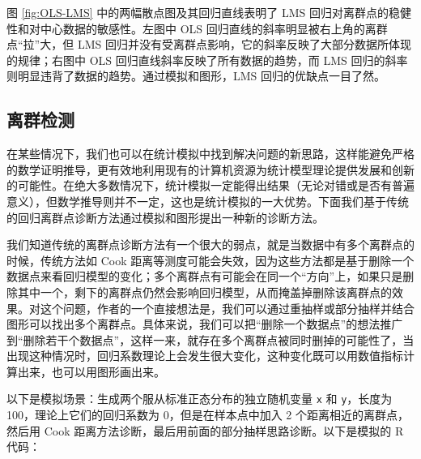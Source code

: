 \documentclass[
  b5paper,
  UTF8,twoside]{book}
\begin{document}
图 \ref{fig:OLS-LMS} 中的两幅散点图及其回归直线表明了 LMS 回归对离群点的稳健性和对中心数据的敏感性。左图中 OLS 回归直线的斜率明显被右上角的离群点``拉''大，但 LMS 回归并没有受离群点影响，它的斜率反映了大部分数据所体现的规律；右图中 OLS 回归直线斜率反映了所有数据的趋势，而 LMS 回归的斜率则明显违背了数据的趋势。通过模拟和图形，LMS 回归的优缺点一目了然。

\hypertarget{ux79bbux7fa4ux68c0ux6d4b}{%
\subsection{离群检测}\label{ux79bbux7fa4ux68c0ux6d4b}}

在某些情况下，我们也可以在统计模拟中找到解决问题的新思路，这样能避免严格的数学证明推导，更有效地利用现有的计算机资源为统计模型理论提供发展和创新的可能性。在绝大多数情况下，统计模拟一定能得出结果（无论对错或是否有普遍意义），但数学推导则并不一定，这也是统计模拟的一大优势。下面我们基于传统的回归离群点诊断方法通过模拟和图形提出一种新的诊断方法。

我们知道传统的离群点诊断方法有一个很大的弱点，就是当数据中有多个离群点的时候，传统方法如 Cook 距离等测度可能会失效，因为这些方法都是基于删除一个数据点来看回归模型的变化；多个离群点有可能会在同一个``方向''上，如果只是删除其中一个，剩下的离群点仍然会影响回归模型，从而掩盖掉删除该离群点的效果。对这个问题，作者的一个直接想法是，我们可以通过重抽样或部分抽样并结合图形可以找出多个离群点。具体来说，我们可以把``删除一个数据点''的想法推广到``删除若干个数据点''，这样一来，就存在多个离群点被同时删掉的可能性了，当出现这种情况时，回归系数理论上会发生很大变化，这种变化既可以用数值指标计算出来，也可以用图形画出来。

以下是模拟场景：生成两个服从标准正态分布的独立随机变量 \texttt{x} 和 \texttt{y}，长度为 100，理论上它们的回归系数为 0，但是在样本点中加入 2 个距离相近的离群点，然后用 Cook 距离方法诊断，最后用前面的部分抽样思路诊断。以下是模拟的 R 代码：
\end{document}
